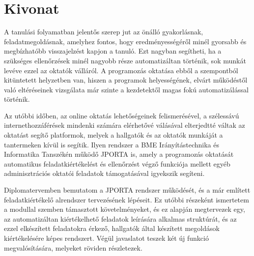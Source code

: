 \chapter*{Kivonat}

A tanulási folyamatban jelentős szerep jut az önálló gyakorlásnak, feladatmegoldásnak, amelyhez fontos, hogy eredményességéről minél gyorsabb és megbízhatóbb visszajelzést kapjon a tanuló.
Ezt nagyban segítheti, ha a szükséges ellenőrzések minél nagyobb része automatizáltan történik, sok munkát levéve ezzel az oktatók válláról.
A programozás oktatása ebből a szempontból kitüntetett helyzetben van, hiszen a programok helyességének, elvárt működéstől való eltéréseinek vizsgálata már szinte a kezdetektől magas fokú automatizálással történik.

Az utóbbi időben, az online oktatás lehetőségeinek felismerésével, a szélessávú internethozzáférések mindenki számára elérhetővé válásával elterjedtté váltak az oktatást segítő platformok, melyek a hallgatók és az oktatók munkáját a tantermeken kívül is segítik.
Ilyen rendszer a BME Irányítástechnika és Informatika Tanszékén működő JPORTA is, amely a programozás oktatását automatikus feladatkiértékelést és ellenőrzést végző funkciója mellett egyéb adminisztrációs oktatói feladatok támogatásával igyekszik segíteni.

Diplomatervemben bemutatom a JPORTA rendszer működését, és a már említett feladatkiértékelő alrendszer tervezésének lépéseit.
Ez utóbbi részeként ismertetem a modullal szemben támasztott követelményeket, és ez alapján megtervezek egy, az automatizáltan kiértékelhető feladatok leírására alkalmas struktúrát, és az ezzel elkészített feladatokra érkező, hallgatók által készített megoldások kiértékelésére képes rendszert.
Végül javaslatot teszek két új funkció megvalósítására, melyeket röviden részletezek.
\vfill

